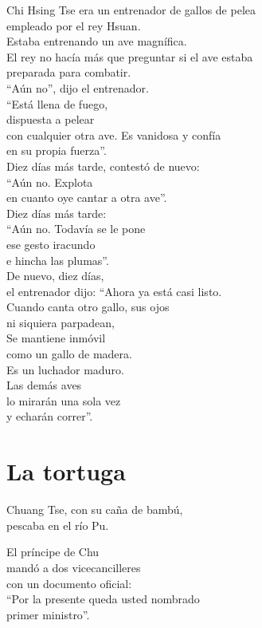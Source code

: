 \documentclass[hidelinks]{memoir}
\begin{document}
	Chi Hsing Tse era un entrenador de gallos de pelea\\
	empleado por el rey Hsuan.\\
	Estaba entrenando un ave magnífica.\\
	El rey no hacía más que preguntar si el ave estaba\\
	preparada para combatir.\\
	``Aún no'', dijo el entrenador.\\
	``Está llena de fuego,\\
	dispuesta a pelear\\
	con cualquier otra ave. Es vanidosa y confía\\
	en su propia fuerza''.\\
	Diez días más tarde, contestó de nuevo:\\
	``Aún no. Explota\\
	en cuanto oye cantar a otra ave''.\\
	Diez días más tarde:\\
	``Aún no. Todavía se le pone\\
	ese gesto iracundo\\
	e hincha las plumas''.\\
	De nuevo, diez días,\\
	el entrenador dijo: ``Ahora ya está casi listo.\\
	Cuando canta otro gallo, sus ojos\\
	ni siquiera parpadean,\\
	Se mantiene inmóvil\\
	como un gallo de madera.\\
	Es un luchador maduro.\\
	Las demás aves\\
	lo mirarán una sola vez\\
	y echarán correr''.
	
	\chapter*{La tortuga}
	
	Chuang Tse, con su caña de bambú,\\
	pescaba en el río Pu.
	
	El príncipe de Chu\\
	mandó a dos vicecancilleres\\
	con un documento oficial:\\
	``Por la presente queda usted nombrado\\
	primer ministro''.
	
\end{document}
